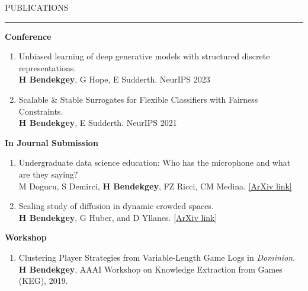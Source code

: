 \documentclass{resume} %
\renewenvironment{rSection}[1]{
\sectionskip
\textcolor{CarnegieMellonRed}{\MakeUppercase{#1}}
\sectionlineskip
\hrule
\begin{list}{}{
\setlength{\leftmargin}{1.5em}
}
\item[]
}{
\end{list}
}
\begin{document}
\begin{rSection}{Publications} \itemsep -2pt
{\bf Conference}
\begin{enumerate}
%
	\item Unbiased learning of deep generative models with structured discrete
representations.\\
		{\bf H Bendekgey}, G Hope, E Sudderth. NeurIPS 2023
	\item Scalable \& Stable Surrogates for Flexible Classifiers with Fairness Constraints.\\
		{\bf H Bendekgey}, E Sudderth. NeurIPS 2021
\end{enumerate}
\vspace{1.0em}
{\bf In Journal Submission}
\begin{enumerate}
	\item Undergraduate data science education: Who has the microphone and what are they saying?\\
		M Dogucu, S Demirci, {\bf H Bendekgey}, FZ Ricci, CM Medina. \href{https://arxiv.org/abs/2403.03387}{[ArXiv link]}
	\item Scaling study of diffusion in dynamic crowded spaces.\\
	      {\bf H Bendekgey}, G Huber, and D Yllanes. \href{https://arxiv.org/abs/2011.02444}{[ArXiv link]}
\end{enumerate}

{\bf Workshop}
\begin{enumerate}
	\item Clustering Player Strategies from Variable-Length Game Logs in {\em Dominion}.\\
		{\bf H Bendekgey}, AAAI Workshop on Knowledge Extraction from Games (KEG), 2019.
\end{enumerate}\vspace{1.em}

\end{rSection}
\end{document}
